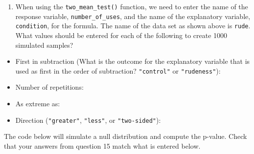 \documentclass[
]{report}
\providecommand{\tightlist}{%
  \setlength{\itemsep}{0pt}\setlength{\parskip}{0pt}}
\begin{document}
\begin{enumerate}
\def\labelenumi{\arabic{enumi}.}
\setcounter{enumi}{14}
\tightlist
\item
  When using the \texttt{two\_mean\_test()} function, we need to enter the name of the response variable, \texttt{number\_of\_uses}, and the name of the explanatory variable, \texttt{condition}, for the formula. The name of the data set as shown above is \texttt{rude}. What values should be entered for each of the following to create 1000 simulated samples?
\end{enumerate}

\begin{itemize}
\tightlist
\item
  First in subtraction (What is the outcome for the explanatory variable that is used as first in the order of subtraction? \texttt{"control"} or \texttt{"rudeness"}):
\end{itemize}

\vspace{.2in}

\begin{itemize}
\tightlist
\item
  Number of repetitions:
\end{itemize}

\vspace{.2in}

\begin{itemize}
\tightlist
\item
  As extreme as:
\end{itemize}

\vspace{.2in}

\begin{itemize}
\tightlist
\item
  Direction (\texttt{"greater"}, \texttt{"less"}, or \texttt{"two-sided"}):
\end{itemize}

\vspace{.2in}

The code below will simulate a null distribution and compute the p-value. Check that your answers from question 15 match what is entered below.
\end{document}
